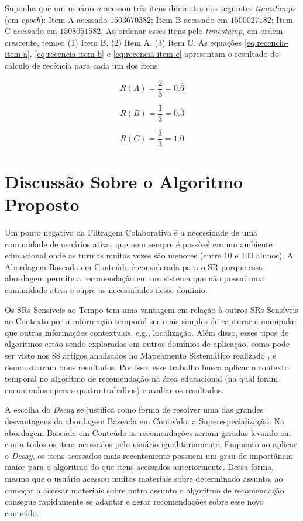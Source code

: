 Suponha que um usuário $u$ acessou três itens diferentes nos seguintes \textit{timestamps} (em \textit{epoch}): Item A acessado $1503670382$;
Item B acessado em $1500027182$; Item C acessado em $1508051582$. Ao ordenar esses itens pelo \textit{timestamp}, em ordem
crescente, temos: (1) Item B, (2) Item A, (3) Item C. As equações \ref{eq:recencia-item-a}, \ref{eq:recencia-item-b} e
\ref{eq:recencia-item-c} apresentam o resultado do cálculo de recência para cada um dos itens:

\begin{equation}
  R(A) = \frac{2}{3} = 0.\overline{6}
  \label{eq:recencia-item-a}
\end{equation}

\begin{equation}
  R(B) = \frac{1}{3} = 0.\overline{3}
  \label{eq:recencia-item-b}
\end{equation}

\begin{equation}
  R(C) = \frac{3}{3} = 1.0
  \label{eq:recencia-item-c}
\end{equation}

\section{Discussão Sobre o Algoritmo Proposto}

Um ponto negativo da Filtragem Colaborativa é a necessidade de uma comunidade de usuários ativa, que nem sempre é
possível em um ambiente educacional onde as turmas muitas vezes são menores (entre 10 e 100 alunos). A Abordagem Baseada
em Conteúdo é considerada para o SR porque essa abordagem permite a recomendação em um sistema que não possui uma
comunidade ativa e supre as necessidades desse domínio.

Os SRs Sensíveis ao Tempo tem uma vantagem em relação à outros SRs Sensíveis ao Contexto por a informação temporal ser
mais simples de capturar e manipular que outras informações contextuais, e.g., localização. Além disso, esses tipos de
algoritmos estão sendo explorados em outros domínios de aplicação, como pode ser visto nos 88 artigos analisados no
Mapeamento Sistemático realizado \cite{de2017time}, e demonstraram bons resultados. Por isso, esse trabalho busca
aplicar o contexto temporal no algoritmo de recomendação na área educacional (na qual foram encontrados apenas quatro
trabalhos) e avaliar os resultados.

A escolha do \textit{Decay} se justifica como forma de resolver uma das grandes desvantagens da abordagem Baseada em Conteúdo: a
Superespecialização. Na abordagem Baseada em Conteúdo as recomendações seriam geradas levando em conta todos os itens
acessados pelo usuário igualitariamente. Enquanto ao aplicar o \textit{Decay}, os itens acessados mais recentemente possuem um
grau de importância maior para o algoritmo do que itens acessados anteriormente. Dessa forma, mesmo que o usuário
acessou muitos materiais sobre determinado assunto, ao começar a acessar materiais sobre outro assunto o algoritmo de
recomendação consegue rapidamente se adaptar e gerar recomendações sobre esse novo conteúdo.


